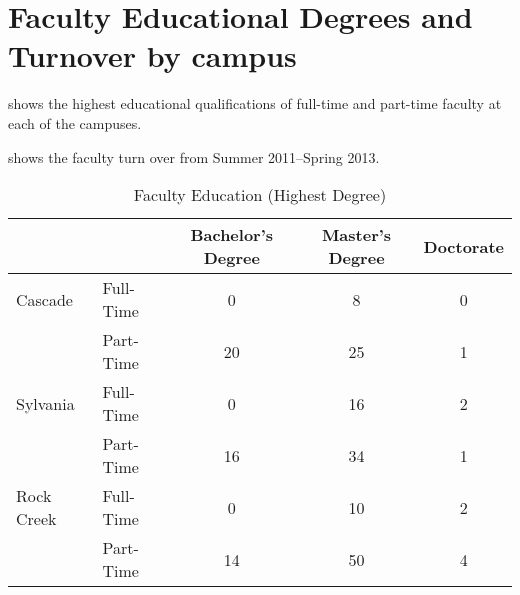 \chapter{Faculty Educational Degrees and Turnover by campus}\label{app:sec:facultyDegrees}

 shows the highest educational 
qualifications of full-time and part-time faculty at each of the campuses.

 shows the faculty turn over from 
Summer 2011--Spring 2013.

\begin{table}[!htb]
	\centering
	\caption{Faculty Education (Highest Degree)}
	\label{app:tab:facultyDegrees}
	\begin{tabular}{ll*{3}{S}}
		\toprule
		 & & {Bachelor's Degree} & {Master's Degree} & {Doctorate} \\
		\midrule
		Cascade    & Full-Time & 0  & 8  & 0 \\
		           & Part-Time & 20 & 25 & 1 \\
		Sylvania   & Full-Time & 0  & 16 & 2 \\
		           & Part-Time & 16 & 34 & 1 \\
		Rock Creek & Full-Time & 0  & 10 & 2 \\
		           & Part-Time & 14 & 50 & 4 \\
		\bottomrule
	\end{tabular}
\end{table}

